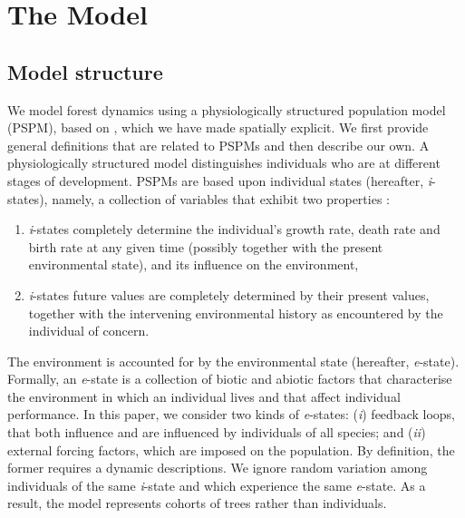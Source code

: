 

\section{The Model}
\subsection{Model structure}
We model forest dynamics using a physiologically structured population model (PSPM), based on \citet{Strigul2008}, which we have made spatially explicit. We first provide general definitions that are related to PSPMs and then describe our own. A physiologically structured model distinguishes individuals who are at different stages of development. PSPMs are based upon individual states (hereafter, \textit{i}-states), namely, a collection of variables that exhibit two properties \citep[for an overview of PSPMs]{DeRoos1997}:
\begin{enumerate}[label=(\roman*)]
	\item \textit{i}-states completely determine the individual's growth rate, death rate and birth rate  at any given time (possibly together with the present environmental state), and its influence on the environment,
	\item \textit{i}-states future values are completely determined by their present values, together with the intervening environmental history as encountered by the individual of concern.
\end{enumerate}
The environment is accounted for by the environmental state (hereafter, \textit{e}-state). Formally, an \textit{e}-state is a collection of biotic and abiotic factors that characterise the environment in which an individual lives and that affect individual performance. In this paper, we consider two kinds of \textit{e}-states: (\textit{i}) feedback loops, that both influence and are influenced by individuals of all species; and (\textit{ii}) external forcing factors, which are imposed on the population. By definition, the former requires a dynamic descriptions. We ignore random variation among individuals of the same \textit{i}-state and which experience the same \textit{e}-state. As a result, the model represents cohorts of trees rather than individuals.

